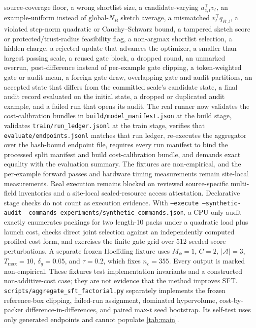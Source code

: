 \documentclass{article}
\begin{document}
source-coverage floor, a wrong shortlist size, a candidate-varying $u_{c,t}^\top v_t$,
an example-uniform instead of global-$N_B$ sketch average, a mismatched
$v_t^\top q_{B,t}$, a violated step-norm quadratic or Cauchy--Schwarz bound, a
tampered sketch score or
protected/trust-radius feasibility flag, a non-argmax shortlist selection, a hidden
charge, a rejected update that advances the
optimizer, a smaller-than-largest passing scale, a reused gate block, a
dropped round, an unmarked overrun, post-difference instead of per-example gate
clipping, a token-weighted gate or audit mean, a foreign gate draw,
overlapping gate and audit partitions, an accepted state that differs from the
committed scale's candidate state, a final audit record evaluated on the
initial state, a dropped or duplicated audit example, and a failed run that
opens its audit. The real runner now validates the cost-calibration bundles in
\texttt{build/model\_manifest.json} at the build stage, validates
\texttt{train/run\_ledger.jsonl} at the train stage, verifies that
\texttt{evaluate/endpoints.jsonl} matches
that run ledger, re-executes the aggregator over the hash-bound endpoint file,
requires every run manifest to bind the processed split manifest and build
cost-calibration bundle, and demands
exact equality with the evaluation summary. The fixtures are non-empirical, and the
per-example forward passes and hardware timing measurements remain site-local
measurements. Real execution
remains blocked on reviewed source-specific multi-field inventories and a
site-local sealed-resource access attestation. Declarative stage checks do
not count as execution evidence.
With \texttt{--execute --synthetic-audit --commands
experiments/synthetic\_commands.json}, a
CPU-only audit exactly enumerates packings for two length-10 packs under a
quadratic load plus launch cost, checks direct joint selection against an
independently computed profiled-cost form, and exercises the
finite gate grid over 512 seeded score perturbations. A separate frozen
Hoeffding fixture uses $M_\phi=1$, $C=2$, $|\mathcal A|=3$,
$T_{\max}=10$, $\delta_g=0.05$, and $\tau=0.2$, which fixes
$n_c=355$. Every output is marked non-empirical. These fixtures test
implementation invariants and a constructed non-additive-cost case; they are
not evidence that the method improves SFT.
\texttt{scripts/aggregate\_sft\_factorial.py} separately implements the frozen
reference-box clipping, failed-run assignment, dominated hypervolume,
cost-by-packer difference-in-differences, and paired max-$t$ seed bootstrap.
Its self-test uses only generated endpoints and cannot populate
\cref{tab:main}.
\end{document}
